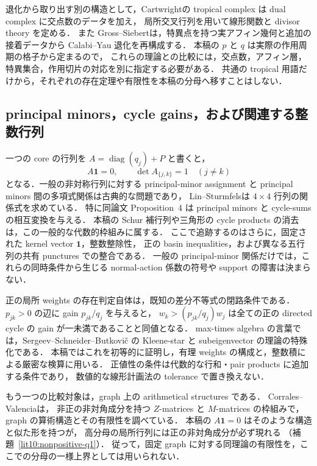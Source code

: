 退化から取り出す別の構造として，Cartwright\cite[Definitions~2.5 and~2.8]{CartwrightComplexes}の
tropical complex は dual complex に交点数のデータを加え，
局所交叉行列を用いて線形関数と divisor theory を定める．
また Gross--Siebert\cite{GrossSiebert}は，特異点を持つ実アフィン幾何と追加の接着データから
Calabi--Yau 退化を再構成する．
本稿の $p$ と $q$ は実際の作用周期の格子から定まるので，
これらの理論との比較には，交点数，アフィン層，特異集合，作用切片の対応を別に指定する必要がある．
共通の tropical 用語だけから，それぞれの存在定理や有限性を本稿の分母へ移すことはしない．

\subsection{principal minors，cycle gains，および関連する整数行列}

一つの core の行列を $A=\operatorname{diag}(q_j)+P$ と書くと，
\[
 A\mathbf1=0,\qquad \det A_{\{j,k\}}=1\quad(j\ne k)
\]
となる．一般の非対称行列に対する principal-minor assignment と
principal minors 間の多項式関係は古典的な問題であり，
Lin--Sturmfels\cite{LinSturmfels}は $4\times4$ 行列の関係式を求めている．
特に同論文 Proposition~4 は principal minors と cycle-sums の相互変換を与える．
本稿の Schur 補行列や三角形の cycle products の消去は，この一般的な代数的枠組みに属する．
ここで追跡するのはさらに，固定された kernel vector $\mathbf1$，整数整除性，
正の basin inequalities，および異なる五行列の共有 punctures での整合である．
一般の principal-minor 関係だけでは，これらの同時条件から生じる
normal-action 係数の符号や support の障害は決まらない．

正の局所 weights の存在判定自体は，既知の差分不等式の閉路条件である．
$p_{jk}>0$ の辺に gain $p_{jk}/q_j$ を与えると，
$w_k>(p_{jk}/q_j)w_j$ は全ての正の directed cycle の gain が一未満であることと同値となる．
max-times algebra の言葉では，Sergeev--Schneider--Butkovi\v c
\cite[\S2, Theorem~2.2]{SergeevSchneiderButkovic}の Kleene-star と subeigenvector の理論の特殊化である．
本稿ではこれを初等的に証明し，有理 weights の構成と，整数積による厳密な検算に用いる．
正値性の条件は代数的な行和・pair products に追加する条件であり，
数値的な線形計画法の tolerance で置き換えない．

もう一つの比較対象は，graph 上の arithmetical structures である．
Corrales--Valencia\cite[\S\S2--3]{CorralesValencia}は，
非正の非対角成分を持つ $Z$-matrices と $M$-matrices の枠組みで，
graph の算術構造とその有限性を調べている．
本稿の $A\mathbf1=0$ はそのような構造と似た形を持つが，
高分母の局所行列には正の非対角成分が必ず現れる
（補題~\ref{lit10:nonpositive-q1}）．
従って，固定 graph に対する同理論の有限性を，ここでの分母の一様上界としては用いられない．

